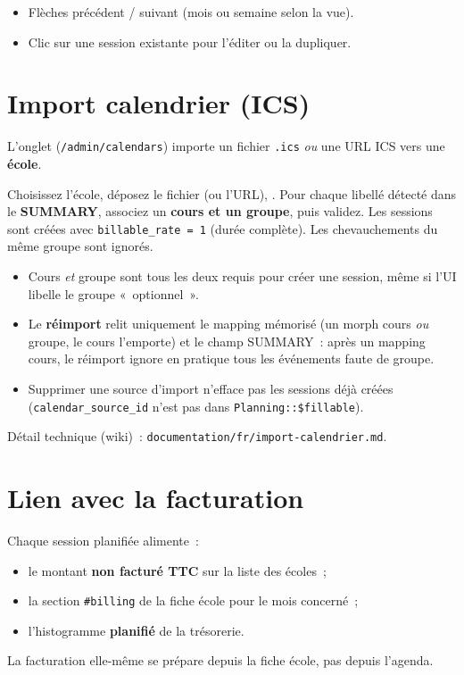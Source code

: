 \begin{itemize}[leftmargin=*]
  \item Flèches précédent / suivant (mois ou semaine selon la vue).
  \item Clic sur une session existante pour l'éditer ou la dupliquer.
\end{itemize}

\section{Import calendrier (ICS)}

L'onglet  (\texttt{/admin/calendars}) importe un fichier \texttt{.ics} \emph{ou} une URL ICS vers une \textbf{école}.

\begin{workflowstep}
  Choisissez l'école, déposez le fichier (ou l'URL), . Pour chaque libellé détecté dans le \textbf{SUMMARY}, associez un \textbf{cours et un groupe}, puis validez. Les sessions sont créées avec \texttt{billable\_rate = 1} (durée complète). Les chevauchements du même groupe sont ignorés.
\end{workflowstep}

\begin{itemize}[leftmargin=*]
  \item Cours \emph{et} groupe sont tous les deux requis pour créer une session, même si l'UI libelle le groupe «~optionnel~».
  \item Le \textbf{réimport} relit uniquement le mapping mémorisé (un morph cours \emph{ou} groupe, le cours l'emporte) et le champ SUMMARY~: après un mapping cours, le réimport ignore en pratique tous les événements faute de groupe.
  \item Supprimer une source d'import n'efface pas les sessions déjà créées (\texttt{calendar\_source\_id} n'est pas dans \texttt{Planning::\$fillable}).
\end{itemize}

Détail technique (wiki)~: \texttt{documentation/fr/import-calendrier.md}.

\section{Lien avec la facturation}

Chaque session planifiée alimente~:

\begin{itemize}[leftmargin=*]
  \item le montant \textbf{non facturé TTC} sur la liste des écoles~;
  \item la section \texttt{\#billing} de la fiche école pour le mois concerné~;
  \item l'histogramme \textbf{planifié} de la trésorerie.
\end{itemize}

La facturation elle-même se prépare depuis la fiche école, pas depuis l'agenda.
